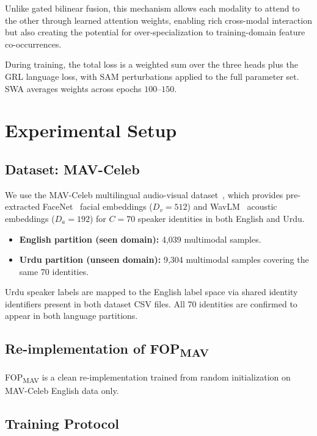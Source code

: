 \documentclass[conference]{IEEEtran}
\newcommand{\fopmav}{FOP\textsubscript{MAV}}
\begin{document}
Unlike gated bilinear fusion, this mechanism allows each modality to attend to
the other through learned attention weights, enabling rich cross-modal
interaction but also creating the potential for over-specialization to
training-domain feature co-occurrences.

During training, the total loss is a weighted sum over the three heads plus the
GRL language loss, with SAM perturbations applied to the full parameter set.
SWA averages weights across epochs $100$--$150$.

\section{Experimental Setup}
\label{sec:setup}

\subsection{Dataset: MAV-Celeb}

We use the MAV-Celeb multilingual audio-visual dataset~\cite{poly2026challenge},
which provides pre-extracted FaceNet~\cite{schroff2015facenet} facial embeddings
($D_v = 512$) and WavLM~\cite{chen2020wavlm} acoustic embeddings ($D_a = 192$)
for $C = 70$ speaker identities in both English and Urdu.

\begin{itemize}
    \item \textbf{English partition (seen domain):} 4,039 multimodal samples.
    \item \textbf{Urdu partition (unseen domain):} 9,304 multimodal samples
    covering the same 70 identities.
\end{itemize}

Urdu speaker labels are mapped to the English label space via shared identity
identifiers present in both dataset CSV files. All 70 identities are confirmed
to appear in both language partitions.

\subsection{Re-implementation of \fopmav{}}

\fopmav{} is a clean re-implementation trained from
random initialization on MAV-Celeb English data only.

\subsection{Training Protocol}
\end{document}
